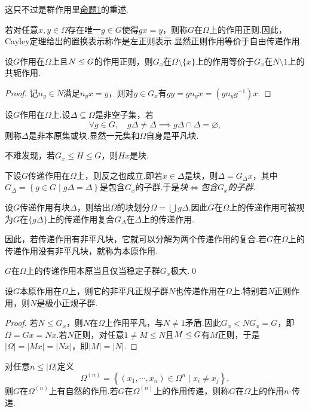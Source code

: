 这只不过是群作用里\hyperlink{prop:GrpActionEquiv}{命题1}的重述.

若对任意$x,y\in\Omega$存在唯一$g\in G$使得$gx=y$，则称$G$在$\Omega$上的作用{\heiti 正则}.因此，Cayley定理给出的置换表示称作是{\heiti 左正则表示}.显然正则作用等价于自由传递作用.

\begin{prop}
	设$G$作用在$\Omega$上且$N\trianglelefteq G$的作用正则，则$G_x$在$\Omega\setminus\{x\}$上的作用等价于$G_x$在$N\setminus 1$上的共轭作用.
\end{prop}
\begin{proof}
	记$n_{y}\in N$满足$n_{y}x=y$，则对$g\in G_x$有$gy=gn_yx=(gn_yg^{-1})x$.
\end{proof}

设$G$作用在$\Omega$上.设$\Delta\subseteq\Omega$是非空子集，若
\[
	\forall g\in G,\quad g\Delta\ne\Delta\implies g\Delta\cap\Delta=\varnothing,
\]
则称$\Delta$是{\heiti 非本原集}或{\heiti 块}.显然一元集和$\Omega$自身是平凡块.

不难发现，若$G_x\le H\le G$，则$Hx$是块.

下设$G$传递作用在$\Omega$上，则反之也成立.即若$x\in\Delta$是块，则$\Delta=G_\Delta x$，其中$G_\Delta=\left\{g\in G\mid g\Delta=\Delta\right\}$是包含$G_x$的子群.于是\emph{块$\Leftrightarrow$包含$G_x$的子群}.

设$G$传递作用有块$\Delta$，则给出$\Omega$的块划分$\Omega=\bigcup g\Delta$.因此$G$在$\Omega$上的传递作用可被视为$G$在$\{g\Delta\}$上的传递作用复合$G_\Delta$在$\Delta$上的传递作用.

因此，若传递作用有非平凡块，它就可以分解为两个传递作用的复合.若$G$在$\Omega$上的传递作用没有非平凡块，就称为{\heiti 本原}作用.

\begin{lemma}
	$G$在$\Omega$上的传递作用本原当且仅当稳定子群$G_x$极大.\qed
\end{lemma}
\begin{prop}
	设$G$本原作用在$\Omega$上，则它的非平凡正规子群$N$也传递作用在$\Omega$上.特别若$N$正则作用，则$N$是极小正规子群.
\end{prop}
\begin{proof}
	若$N\le G_x$，则$N$在$\Omega$上作用平凡，与$N\ne 1$矛盾.因此$G_x<NG_x=G$，即$\Omega=Gx=Nx$.若$N$正则，对任意$1\ne M\le N$且$M\trianglelefteq G$有$M$正则，于是$|\Omega|=|Mx|=|Nx|$，即$|M|=|N|$.
\end{proof}

对任意$n\le|\Omega|$定义
\[
	\Omega^{(n)}=\left\{(x_1,\cdots,x_n)\in\Omega^n\mid x_i\ne x_j\right\},
\]
则$G$在$\Omega^{(n)}$上有自然的作用.若$G$在$\Omega^{(n)}$上的作用传递，则称$G$在$\Omega$上的作用$n$-{\heiti 传递}.

